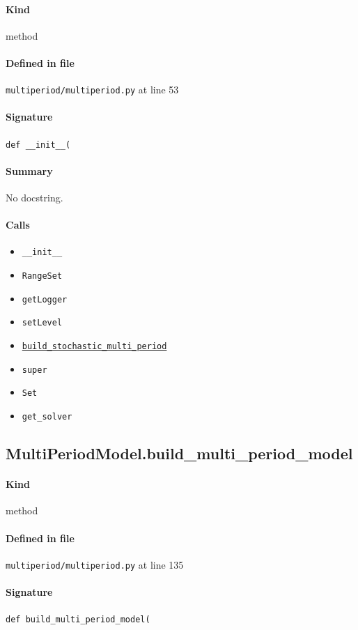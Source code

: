 \documentclass[11pt]{report}
\begin{document}
\paragraph{Kind} method
\paragraph{Defined in file} \texttt{multiperiod/multiperiod.py} at line 53
\paragraph{Signature} \texttt{def \_\_init\_\_(}
\paragraph{Summary} No docstring.
\paragraph{Calls}
\begin{itemize}[leftmargin=*]
  \item \texttt{\_\_init\_\_}
  \item \texttt{RangeSet}
  \item \texttt{getLogger}
  \item \texttt{setLevel}
  \item \hyperref[def:multiperiod-multiperiod.py:MultiPeriodModel.build_stochastic_multi_period:L351]{\texttt{build\_stochastic\_multi\_period}}
  \item \texttt{super}
  \item \texttt{Set}
  \item \texttt{get\_solver}
\end{itemize}
\subsection{MultiPeriodModel.build\_multi\_period\_model}
\label{def:multiperiod-multiperiod.py:MultiPeriodModel.build_multi_period_model:L135}
\paragraph{Kind} method
\paragraph{Defined in file} \texttt{multiperiod/multiperiod.py} at line 135
\paragraph{Signature} \texttt{def build\_multi\_period\_model(}
\end{document}
